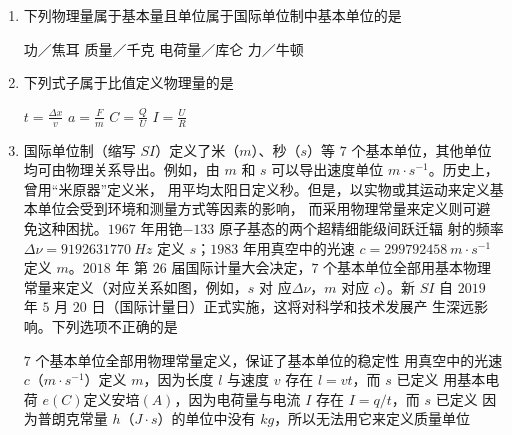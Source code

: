 
\begin{enumerate}
	\item
{}
下列物理量属于基本量且单位属于国际单位制中基本单位的是  

\fourchoices
{功／焦耳}
{质量／千克}
{电荷量／库仑}
{力／牛顿}



\item 
{}
下列式子属于比值定义物理量的是  

\fourchoices
{$t=\frac{\Delta x}{v}$}
{$a=\frac{F}{m}$}
{$C=\frac{Q}{U}$}
{$I=\frac{U}{R}$}




\item 
{}
国际单位制（缩写 $ SI $）定义了米（$ m $）、秒（$ s $）等 $ 7 $ 个基本单位，其他单位
均可由物理关系导出。例如，由 $ m $ 和 $ s $ 可以导出速度单位 $ m \cdot s^{-1} $。历史上，曾用“米原器”定义米，
用平均太阳日定义秒。但是，以实物或其运动来定义基本单位会受到环境和测量方式等因素的影响，
而采用物理常量来定义则可避免这种困扰。$ 1967 $ 年用铯$- 133 $ 原子基态的两个超精细能级间跃迁辐
射的频率$ \Delta\nu =9192631770 \ Hz $ 定义 $ s $；$ 1983 $ 年用真空中的光速 $ c=299792458 \ m \cdot s  ^{-1} $ 定义 $ m $。$ 2018 $ 年
第 $ 26 $ 届国际计量大会决定，$ 7 $ 个基本单位全部用基本物理常量来定义（对应关系如图，例如，$ s $ 对
应$ \Delta \nu $，$ m $ 对应 $ c $）。新 $ SI $ 自 $ 2019 $ 年 $ 5 $ 月 $ 20 $ 日（国际计量日）正式实施，这将对科学和技术发展产
生深远影响。下列选项不正确的是  
\begin{figure}[h!]
	\centering
	
\end{figure}


\fourchoices
{$ 7 $ 个基本单位全部用物理常量定义，保证了基本单位的稳定性}
{用真空中的光速 $ c $（$ m \cdot s ^{-1} $）定义 $ m $，因为长度 $ l $ 与速度 $ v $ 存在 $ l=vt $，而 $ s $ 已定义}
{用基本电荷 $ e(C) $定义安培$ (A) $，因为电荷量与电流 $ I $ 存在 $ I=q/t $，而 $ s $ 已定义}
{因为普朗克常量 $ h $（$ J \cdot s $）的单位中没有 $ kg $，所以无法用它来定义质量单位}



\end{enumerate}

